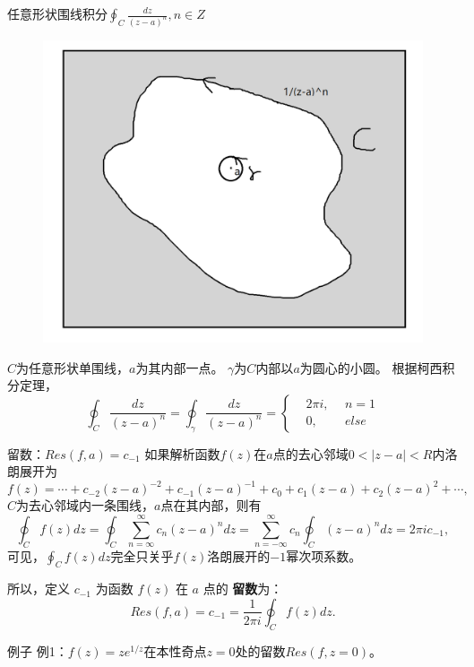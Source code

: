 \documentclass[11pt]{beamer}
\begin{document}
\begin{frame}{任意形状围线积分$\oint_C \frac{dz}{(z-a)^n}, n\in Z$}
\begin{figure}
\centering
\includegraphics[width=0.4\linewidth]{chap5page2}
\label{fig:chap5page2}
\end{figure}
$C$为任意形状单围线，$a$为其内部一点。
$\gamma$为$C$内部以$a$为圆心的小圆。
根据柯西积分定理，
\begin{equation}
\oint_C \frac{dz}{(z-a)^n} = \oint_\gamma \frac{dz}{(z-a)^n} = \left\{
\begin{aligned}
& 2\pi i, ~~ & n=1 \\
& 0, ~~ & else
\end{aligned}
\right.
\end{equation}

\end{frame}

\begin{frame}{留数：$Res(f,a)=c_{-1}$}
如果解析函数$f(z)$在$a$点的去心邻域$0<|z-a|<R$内洛朗展开为
\begin{equation}
f(z) = \cdots + c_{-2} (z-a)^{-2} + c_{-1}(z-a)^{-1} + c_0 + c_1(z-a) + c_2(z-a)^2 + \cdots,
\end{equation}
$C$为去心邻域内一条围线，$a$点在其内部，则有
\begin{equation}
\oint_C f(z) dz 
= \oint_C \sum_{n=\infty}^{\infty} c_n (z-a)^n dz
= \sum_{n=-\infty}^{\infty} c_n \oint_C (z-a)^n dz
= 2 \pi i c_{-1},
\end{equation}
可见，$\oint_C f(z) dz$完全只关乎$f(z)$洛朗展开的$-1$幂次项系数。

所以，定义 $c_{-1}$ 为函数 $f(z)$ 在 $a$ 点的 {\bf 留数}为：
\begin{equation}
Res(f,a) = c_{-1} = \frac{1}{2\pi i} \oint_C f(z) dz.
\end{equation}
\end{frame}

\begin{frame}{例子}
例1：$f(z)=ze^{1/z}$在本性奇点$z=0$处的留数$Res(f,z=0)$。 

\end{frame}
\end{document}
